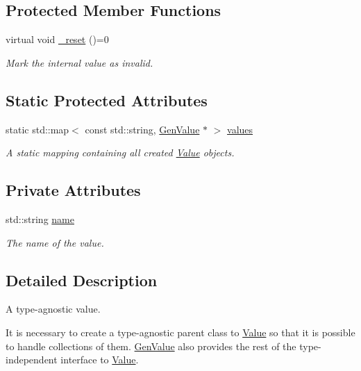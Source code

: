 \subsection*{Protected Member Functions}
\begin{DoxyCompactItemize}
\item 
virtual void \hyperlink{classfilval_1_1GenValue_ae9d5bd9fde2d04f6cd05d5b901a8c78a}{\+\_\+reset} ()=0
\begin{DoxyCompactList}\small\item\em Mark the internal value as invalid. \end{DoxyCompactList}\end{DoxyCompactItemize}
\subsection*{Static Protected Attributes}
\begin{DoxyCompactItemize}
\item 
static std\+::map$<$ const std\+::string, \hyperlink{classfilval_1_1GenValue}{Gen\+Value} $\ast$ $>$ \hyperlink{classfilval_1_1GenValue_aa94f38a80f5a127bf3df33ad53198e57}{values}
\begin{DoxyCompactList}\small\item\em A static mapping containing all created \hyperlink{classfilval_1_1Value}{Value} objects. \end{DoxyCompactList}\end{DoxyCompactItemize}
\subsection*{Private Attributes}
\begin{DoxyCompactItemize}
\item 
std\+::string \hyperlink{classfilval_1_1GenValue_a007e38c03ee041c2a657afa3d6e91ab1}{name}
\begin{DoxyCompactList}\small\item\em The name of the value. \end{DoxyCompactList}\end{DoxyCompactItemize}


\subsection{Detailed Description}
A type-\/agnostic value. 

It is necessary to create a type-\/agnostic parent class to \hyperlink{classfilval_1_1Value}{Value} so that it is possible to handle collections of them. \hyperlink{classfilval_1_1GenValue}{Gen\+Value} also provides the rest of the type-\/independent interface to \hyperlink{classfilval_1_1Value}{Value}. 


